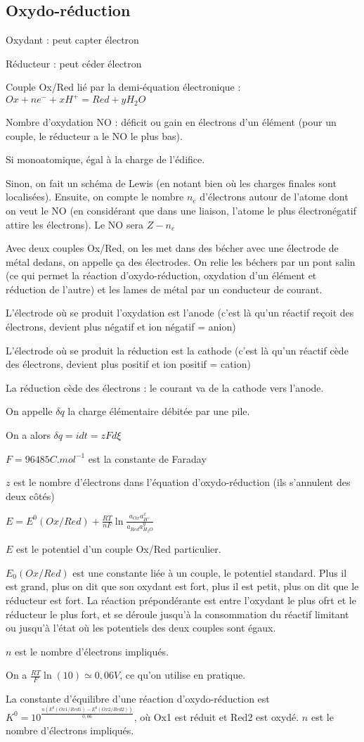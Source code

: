 \documentclass[a4paper,12pt]{book}
\newcommand{\Def}[2]{\begin{tcolorbox}[colback=white,colframe=red!10!green!20!blue!75!, title=Définition : #1]#2\end{tcolorbox}}
\newcommand{\Thr}[2]{\begin{tcolorbox}[sharp corners, colback=white,colframe=red!10!blue!30!green!75!, title=Théorème : #1]#2\end{tcolorbox}}
\newcommand{\Meth}[2]{\begin{tcolorbox}[colback=white,colframe=green!60!green!30!black!75, title=Méthode :  #1]#2\end{tcolorbox}}
\begin{document}
\subsection{Oxydo-réduction}
\Def{}{Oxydant : peut capter électron
\par Réducteur : peut céder électron
\par Couple Ox/Red lié par la demi-équation électronique : $Ox + ne^- +xH^+= Red + yH_2O$
\par Nombre d'oxydation NO : déficit ou gain en électrons d'un élément (pour un couple, le réducteur a le NO le plus bas).}
\Meth{Déterminer le NO}{Si monoatomique, égal à la charge de l'édifice.
\par Sinon, on fait un schéma de Lewis (en notant bien où les charges finales sont localisées). Ensuite, on compte le nombre $n_e$ d'électrons autour de l'atome dont on veut le NO (en considérant que dans une liaison, l'atome le plus électronégatif attire les électrons). Le NO sera $Z-n_e$}
\Def{Pile}{Avec deux couples Ox/Red, on les met dans des bécher avec une électrode de métal dedans, on appelle ça des électrodes. On relie les béchers par un pont salin (ce qui permet la réaction d'oxydo-réduction, oxydation d'un élément et réduction de l'autre) et les lames de métal par un conducteur de courant.
\par L'électrode où se produit l'oxydation est l'anode (c'est là qu'un réactif reçoit des électrons, devient plus négatif et ion négatif = anion)
\par L'électrode où se produit la réduction est la cathode (c'est là qu'un réactif cède des électrons, devient plus positif et ion positif = cation)
\par La réduction cède des électrons : le courant va de la cathode vers l'anode.
\par On appelle $\delta q$ la charge élémentaire débitée par une pile.
\par On a alors $\delta q = idt = zFd\xi$
\par $F = 96485 C.mol^{-1}$ est la constante de Faraday
\par $z$ est le nombre d'électrons dans l'équation d'oxydo-réduction (ils s'annulent des deux côtés)}
\Thr{Nernst}{$E = E^0(Ox/Red) + \frac{RT}{nF}\ln \frac{a_{Ox}a_{H^+}^x}{a_{Red}a_{H_2O}^y}$
\par $E$ est le potentiel d'un couple Ox/Red particulier.
\par $E_0(Ox/Red)$ est une constante liée à un couple, le potentiel standard. Plus il est grand, plus on dit que son oxydant est fort, plus il est petit, plus on dit que le réducteur est fort. La réaction prépondérante est entre l'oxydant le plus ofrt et le réducteur le plus fort, et se déroule jusqu'à la consommation du réactif limitant ou jusqu'à l'état où les potentiels des deux couples sont égaux.
\par $n$ est le nombre d'électrons impliqués.
\par On a $\frac{RT}{F}\ln(10)\simeq 0,06 V$, ce qu'on utilise en pratique.
\par La constante d'équilibre d'une réaction d'oxydo-réduction est $K^0 = 10^{\frac{n(E^0(Ox1/Red1)-E^0(Ox2/Red2))}{0,06}}$, où Ox1 est réduit et Red2 est oxydé. $n$ est le nombre d'électrons impliqués.}
\end{document}
